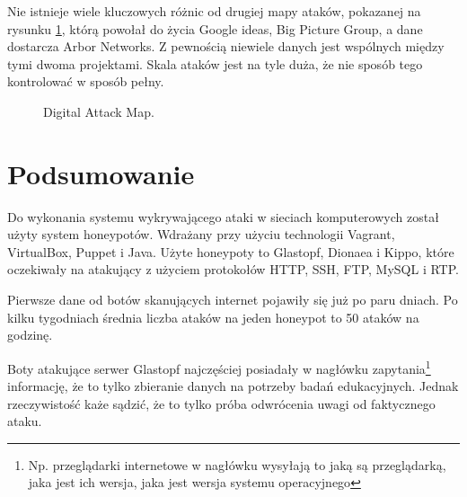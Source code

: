 \documentclass[runningheads,a4paper]{llncs}
\begin{document}
Nie istnieje wiele kluczowych różnic od drugiej mapy ataków, pokazanej na rysunku \ref{fig:digitalattackmap_fig}, którą powołał do życia Google ideas, Big Picture Group, a dane dostarcza Arbor Networks. Z pewnością niewiele danych jest wspólnych między tymi dwoma projektami. Skala ataków jest na tyle duża, że nie sposób tego kontrolować w sposób pełny.

\begin{figure}
        \centering
        \caption{Digital Attack Map.}
        \label{fig:digitalattackmap_fig}
\end{figure}

\section{Podsumowanie}

Do wykonania systemu wykrywającego ataki w sieciach komputerowych został użyty system honeypotów. Wdrażany przy użyciu technologii Vagrant, VirtualBox, Puppet i Java. Użyte honeypoty to Glastopf, Dionaea i Kippo, które oczekiwały na atakujący z użyciem protokołów HTTP, SSH, FTP, MySQL i RTP.

Pierwsze dane od botów skanujących internet pojawiły się już po paru dniach. Po kilku tygodniach średnia liczba ataków na jeden honeypot to 50 ataków na godzinę.

Boty atakujące serwer Glastopf najczęściej posiadały w nagłówku zapytania\footnote{Np. przeglądarki internetowe w nagłówku wysyłają to jaką są przeglądarką, jaka jest ich wersja, jaka jest wersja systemu operacyjnego} informację, że to tylko zbieranie danych na potrzeby badań edukacyjnych. Jednak rzeczywistość każe sądzić, że to tylko próba odwrócenia uwagi od faktycznego ataku.
\end{document}
